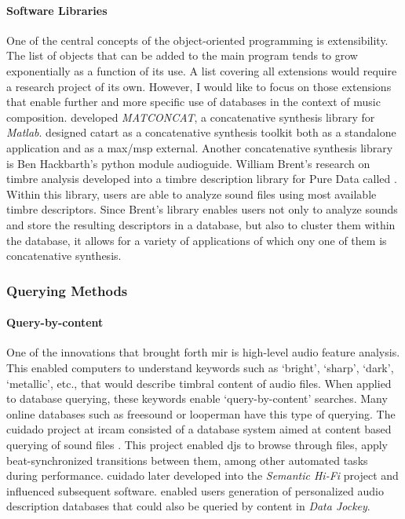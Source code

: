 	\paragraph{Software Libraries}
	One of the central concepts of the object-oriented programming is extensibility. The list of objects that can be added to the main program tends to grow exponentially as a function of its use. A list covering all extensions would require a research project of its own. However, I would like to focus on those extensions that enable further and more specific use of databases in the context of music composition. \textcite{Stu04:Mat} developed \textit{MATCONCAT}, a concatenative synthesis library for \textit{Matlab}. \textcite{Sch06:Rea} designed \gls{catart} as a concatenative synthesis toolkit both as a standalone application and as a \gls{max/msp} external. Another concatenative synthesis library is Ben Hackbarth's python module \gls{audioguide}. William Brent's research on timbre analysis developed into a timbre description library for Pure Data called  \parencite{icmc/bbp2372.2010.044}. Within this library, users are able to analyze sound files using most available timbre descriptors. Since Brent's library enables users not only to analyze sounds and store the resulting descriptors in a database, but also to cluster them within the database, it allows for a variety of applications of which ony one of them is concatenative synthesis.

\subsubsection{Querying Methods}

	\paragraph{Query-by-content}
	One of the innovations that brought forth \gls{mir} is high-level audio feature analysis. This enabled computers to understand keywords such as `bright', `sharp', `dark', `metallic', etc., that would describe timbral content of audio files. When applied to database querying, these keywords enable `query-by-content' searches. Many online databases such as \gls{freesound} or \gls{looperman} have this type of querying. The \gls{cuidado} project at \gls{ircam} consisted of a database system aimed at content based querying of sound files \parencites{DBLP:conf/ismir/VinetHP02}{DBLP:conf/icmc/VinetHP02}{DBLP:conf/icmc/Vinet05}. This project enabled \glspl{dj} to browse through files, apply beat-synchronized transitions between them, among other automated tasks during performance. \gls{cuidado} later developed into the \textit{Semantic Hi-Fi} project and influenced subsequent software. \textcite{icmc/bbp2372.2007.117} enabled users generation of personalized audio description databases that could also be queried by content in \textit{Data Jockey}.

